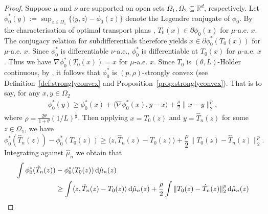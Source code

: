 \documentclass[11pt]{article}
\begin{document}
\begin{proof}
Suppose $\mu$ and $\nu$ are supported on open sets $\Omega_1, \Omega_2 \subseteq \mathbb{R}^d$, respectively. Let $\phi_0^*(y):=\sup_{z \in \Omega_1}\{\langle y,z\rangle-\phi_0(z)\}$ denote the Legendre conjugate of $\phi_0$. By the characterisation of optimal transport plans \citep[see, e.g.,][Theorem 2.29]{villani2021topics}, $T_0(x)\in\partial\phi_0(x)$ for $\mu$-a.e. $x$. The conjugacy relation for subdifferentials therefore yields $x\in\partial\phi_0^*(T_0(x))$ for $\mu$-a.e. $x$. Since $\phi_0^*$ is differentiable $\nu$-a.e., $\phi_0^*$ is differentiable at $T_0(x)$ for $\mu$-a.e. $x$. Thus we have $\nabla\phi_0^*(T_0(x))=x$ for $\mu$-a.e. $x$. Since $T_0$ is $(\theta, L)$-H\"older continuous, by \citet[Lemma 1]{yan2020stochastic}, it follows that $\phi_0^*$ is $(p, \rho)$-strongly convex (see Definition~\ref{def:stronglyconvex} and Proposition~\ref{prop:stronglyconvex}). That is to say, for any $x, y \in \Omega_2$
\begin{align*}
    \phi_0^*(y) \geq \phi_0^*(x) + \langle \nabla\phi_0^* (x) ,y - x \rangle + \frac{\rho}{2}\|x-y\|_2^{p},
\end{align*}
where $\rho = \frac{2\theta}{1+\theta}(1/L)^{\frac{1}{\theta}}$. Then applying $x = T_0(z)$ and $y = \hat T_n(z)$ for some $z \in \Omega_1$, we have 
\[
   \phi_0^*(\hat T_n(z)) - \phi_0^*(T_0(z))  \geq \langle z ,\hat T_n(z) - T_0(z) \rangle + \frac{\rho}{2}\|T_0(z) - \hat T_n(z)\|_2^{p}. 
\]
Integrating against $\hat \mu_n$ we obtain that 
\begin{align}
   \int \phi_0^*(\hat T_n(z)) &- \phi_0^*(T_0(z))\, \mathrm{d}\hat \mu_n(z)\notag\\
   & \geq \int \langle z ,\hat T_n(z) - T_0(z) \rangle  \, \mathrm{d}\hat \mu_n(z)+  \frac{\rho}{2} \int \|T_0(z) - \hat T_n(z)\|_2^{p}  \, \mathrm{d}\hat \mu_n(z) \label{ineq:IntStronglyConv}
\end{align}


\end{proof}
\end{document}

